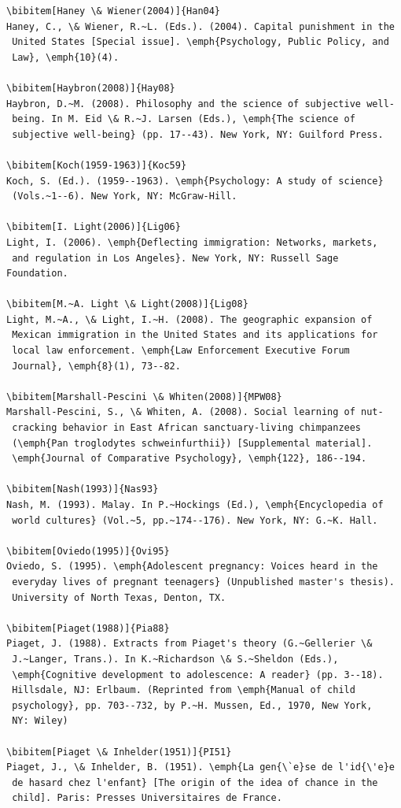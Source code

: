 \documentclass[]{interact}
\theoremstyle{plain}%
\theoremstyle{definition}
\theoremstyle{remark}
\begin{document}
\begin{verbatim}
\bibitem[Haney \& Wiener(2004)]{Han04}
Haney, C., \& Wiener, R.~L. (Eds.). (2004). Capital punishment in the
 United States [Special issue]. \emph{Psychology, Public Policy, and
 Law}, \emph{10}(4).

\bibitem[Haybron(2008)]{Hay08}
Haybron, D.~M. (2008). Philosophy and the science of subjective well-
 being. In M. Eid \& R.~J. Larsen (Eds.), \emph{The science of
 subjective well-being} (pp. 17--43). New York, NY: Guilford Press.

\bibitem[Koch(1959-1963)]{Koc59}
Koch, S. (Ed.). (1959--1963). \emph{Psychology: A study of science}
 (Vols.~1--6). New York, NY: McGraw-Hill.

\bibitem[I. Light(2006)]{Lig06}
Light, I. (2006). \emph{Deflecting immigration: Networks, markets,
 and regulation in Los Angeles}. New York, NY: Russell Sage Foundation.

\bibitem[M.~A. Light \& Light(2008)]{Lig08}
Light, M.~A., \& Light, I.~H. (2008). The geographic expansion of
 Mexican immigration in the United States and its applications for
 local law enforcement. \emph{Law Enforcement Executive Forum
 Journal}, \emph{8}(1), 73--82.

\bibitem[Marshall-Pescini \& Whiten(2008)]{MPW08}
Marshall-Pescini, S., \& Whiten, A. (2008). Social learning of nut-
 cracking behavior in East African sanctuary-living chimpanzees
 (\emph{Pan troglodytes schweinfurthii}) [Supplemental material].
 \emph{Journal of Comparative Psychology}, \emph{122}, 186--194.

\bibitem[Nash(1993)]{Nas93}
Nash, M. (1993). Malay. In P.~Hockings (Ed.), \emph{Encyclopedia of
 world cultures} (Vol.~5, pp.~174--176). New York, NY: G.~K. Hall.

\bibitem[Oviedo(1995)]{Ovi95}
Oviedo, S. (1995). \emph{Adolescent pregnancy: Voices heard in the
 everyday lives of pregnant teenagers} (Unpublished master's thesis).
 University of North Texas, Denton, TX.

\bibitem[Piaget(1988)]{Pia88}
Piaget, J. (1988). Extracts from Piaget's theory (G.~Gellerier \&
 J.~Langer, Trans.). In K.~Richardson \& S.~Sheldon (Eds.),
 \emph{Cognitive development to adolescence: A reader} (pp. 3--18).
 Hillsdale, NJ: Erlbaum. (Reprinted from \emph{Manual of child
 psychology}, pp. 703--732, by P.~H. Mussen, Ed., 1970, New York,
 NY: Wiley)

\bibitem[Piaget \& Inhelder(1951)]{PI51}
Piaget, J., \& Inhelder, B. (1951). \emph{La gen{\`e}se de l'id{\'e}e
 de hasard chez l'enfant} [The origin of the idea of chance in the
 child]. Paris: Presses Universitaires de France.


\end{verbatim}
\end{document}

